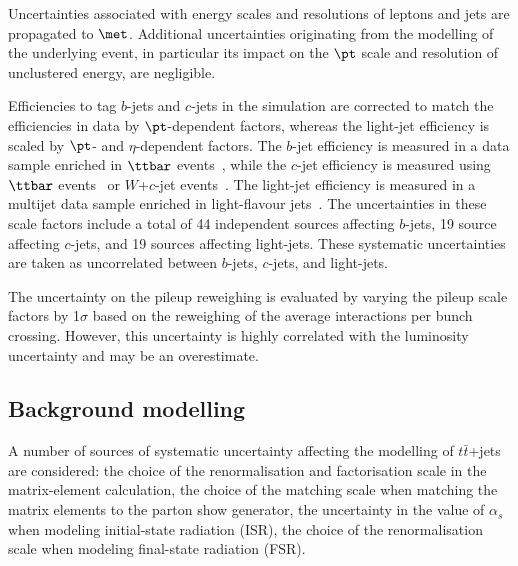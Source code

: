 Uncertainties associated with energy scales and resolutions of leptons and jets 
are propagated to $\met$. Additional uncertainties originating from the modelling 
of the underlying event, in particular its impact on the $\pt$ scale and resolution 
of unclustered energy, are negligible.

Efficiencies to tag $b$-jets and $c$-jets in the simulation are corrected to match the efficiencies in data by $\pt$-dependent factors,
whereas the light-jet efficiency is scaled by $\pt$- and $\eta$-dependent factors.
The $b$-jet efficiency is measured in a data sample enriched in $\ttbar$ events~\cite{Aad:2019epj79}, %
  while the $c$-jet efficiency is measured
using $\ttbar$ events~\cite{ATLAS-CONF-2018-001} or $W$+$c$-jet events~\cite{Aad:2015ydr}. 
The light-jet efficiency is measured in a multijet data sample enriched in light-flavour jets~\cite{ATLAS-CONF-2018-006}.
The uncertainties in these scale factors include a total of 44 independent sources affecting $b$-jets, 19 source affecting $c$-jets, and 19 sources affecting light-jets. 
These systematic uncertainties are taken as uncorrelated between $b$-jets, $c$-jets, and light-jets.

The uncertainty on the pileup reweighing is evaluated by varying the pileup scale factors
by 1$\sigma$ based on the reweighing of the average interactions per bunch crossing. However, this
uncertainty is highly correlated with the luminosity uncertainty and may be an overestimate.

\subsection{Background modelling}
\label{sec:syst_bkgmodeling}

A number of sources of systematic uncertainty affecting the modelling of $t\bar{t}$+jets are considered: the choice of the renormalisation and factorisation scale in the matrix-element calculation, the choice of the matching scale when matching the matrix elements to the parton show generator, the uncertainty in the value of $\alpha_s$ when modeling initial-state radiation (ISR), the choice of the renormalisation scale when modeling final-state radiation (FSR).

